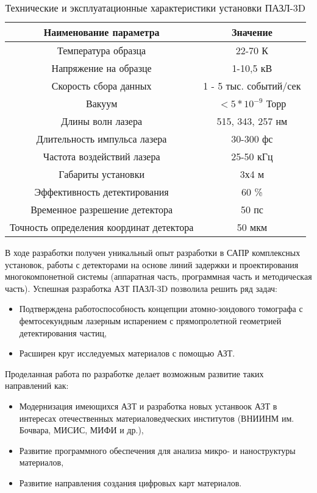\begin{table} [htbp]
	\centering
	\caption{Технические и эксплуатационные характеристики установки ПАЗЛ-3D}
	\label{tab:APPLEcharac}
	\begin{SingleSpace}
		\begin{tabular} {| c | c |}
			\hline
			Наименование параметра & Значение  \\ \hline
			Температура образца & 22-70 К                \\ \hline
			Напряжение на образце & 1-10,5 кВ               \\ \hline
			Скорость сбора данных & 1 - 5 тыс. событий/сек                \\ \hline
			Вакуум & $<5*10^{-9}$ Торр                \\ \hline
			Длины волн лазера & 515, 343, 257 нм               \\ \hline
			Длительность импульса лазера & 30-300 фс               \\ \hline
			Частота воздействий лазера & 25-50 кГц                \\ \hline
			Габариты установки & 3х4 м               \\ \hline
			Эффективность детектирования & 60 \%              \\ \hline
			Временное разрешение детектора & 50 пс               \\ \hline
			Точность определения координат детектора  & 50 мкм               \\ \hline
		\end{tabular}
	\end{SingleSpace}
\end{table}
В ходе разработки получен уникальный опыт разработки в САПР комплексных установок,  работы с детекторами на основе линий задержки и проектирования многокомпонетной системы (аппаратная часть, программная часть и методическая часть). Успешная разработка АЗТ ПАЗЛ-3D позволила решить ряд задач:

\begin{itemize}
	\item Подтверждена работоспособность концепции атомно-зондового томографа с фемтосекундным лазерным испарением с прямопролетной геометрией детектирования частиц,
	\item Расширен круг исследуемых материалов с помощью АЗТ.
\end{itemize}

Проделанная работа по разработке делает возможным развитие таких направлений как:
\begin{itemize}
	\item Модернизация имеющихся АЗТ и разработка новых устанвоок АЗТ в интересах отечественных материаловедческих институтов (ВНИИНМ им. Бочвара, МИСИС, МИФИ  и др.),
	\item Развитие программного обеспечения для анализа микро- и наноструктуры материалов,
	\item Развитие направления создания цифровых карт материалов.
\end{itemize}

\FloatBarrier







